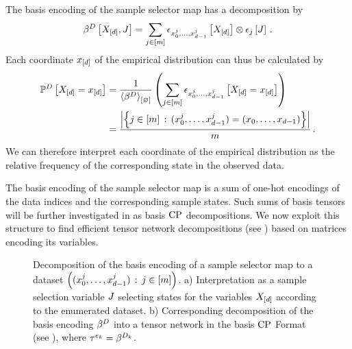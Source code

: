 The basis encoding of the sample selector map has a decomposition by
\begin{align*}
    \beta^{D}\left[X_{[d]},J\right]
    = \sum_{j\in[m]} \epsilon_{{x_{0}^{j},\ldots,x_{d-1}^{j}}}\left[X_{[d]}\right] \otimes \epsilon_{j}\left[J\right] \, .
\end{align*}
Each coordinate $x_{[d]}$ of the empirical distribution can thus be calculated by
\begin{align*}
    \mathbb{P}^{D}\left[X_{[d]}=x_{[d]}\right]
    & = \frac{1}{\left\langle \beta^{D}\right\rangle_{\left[ \varnothing \right]}} \left( \sum_{j\in[m]} \epsilon_{{x_{0}^{j},\ldots,x_{d-1}^{j}}}\left[X_{[d]}=x_{[d]}\right]  \right) \\
    &= \frac{\left|\left\{j\in[m] \,:\, ({x_{0}^{j},\ldots,x_{d-1}^{j}}) = (x_{0},\ldots,x_{d-1})\right\}\right|}{m} \, .
\end{align*}
We can therefore interpret each coordinate of the empirical distribution as the relative frequency of the corresponding state in the observed data.

The basis encoding of the sample selector map is a sum of one-hot encodings of the data indices and the corresponding sample states.
Such sums of basis tensors will be further investigated in  as basis $\mathrm{CP}$ decompositions.
We now exploit this structure to find efficient tensor network decompositions (see ) based on matrices encoding its variables.


\begin{figure}[t]
    \begin{center}
        
    \end{center}
    \caption{
        Decomposition of the basis encoding of a sample selector map to a dataset $\left(({x_{0}^{j},\ldots,x_{d-1}^{j}})\,:\,j\in[m]\right)$.
        a) Interpretation as a sample selection variable $J$ selecting states for the variables $X_{[d]}$ according to the enumerated dataset.
        b) Corresponding decomposition of the basis encoding $\beta^{D}$ into a tensor network in the basis $\mathrm{CP}$ Format (see ), where $\tau^{e_{k}}=\beta^{D_{k}}$.
    }
    \label{fig:DataDecomposition}
\end{figure}


